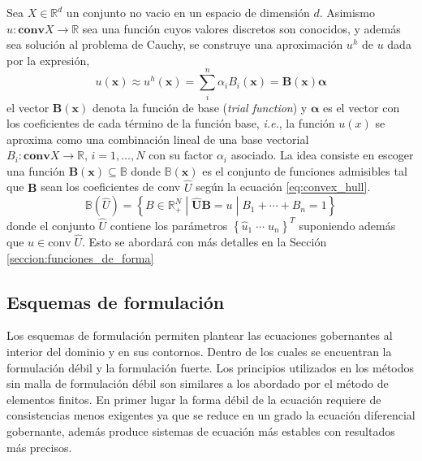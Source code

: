 Sea $X \in \mathbb{R}^d$ un conjunto no vacio en un espacio de dimensión $d$. Asimismo $u : \bm{\mbox{conv}} X \rightarrow \mathbb{R}$ sea una función cuyos valores discretos son conocidos, y además sea solución al problema de Cauchy, se construye una aproximación $u^h$ de $u$ dada por la expresión, 
\begin{equation} \label{ec:1app} 
    u(\bm{x}) \approx u^h(\bm{x}) = \sum_i^n \alpha_i B_i (\bm{x}) = \bm{B}(\bm{x}) \bm{\alpha} 
\end{equation}
el vector $\bm{B}(\bm{x})$ denota la función de base (\textit{trial function}) y $\bm{\alpha}$ es el vector con los coeficientes de cada término de la función base, \textit{i.e.}, la función $u(x)$ se aproxima como una combinación lineal de una base vectorial $B_i : \bm{\mbox{conv}} X \rightarrow \mathbb{R}, \, i=1,\ldots,N$ con su factor $\alpha_i$ asociado. La idea consiste en escoger una función $\bm{B}(\bm{x}) \subseteq \mathbb{B}$ donde $\mathbb{B}(\bm{x})$ es el conjunto de funciones admisibles tal que $\bm{B}$ sean los coeficientes de conv $\hat{U}$ según la ecuación \ref{eq:convex_hull}. 
\begin{equation}
    \mathbb{B}(\hat{U}) = \left\{ B \in \mathbb{R}_+^N \; | \; \hat{\bm{U}} \bm{B} = u \; | \;  B_1 + \cdots + B_n = 1  \right\} 
\end{equation}
donde el conjunto $\hat{U}$ contiene los parámetros $\left\{ \hat{u}_1 \; \cdots \; u_n \right\}^T$ suponiendo además que $u \in \mbox{conv} \; \hat{U}$. Esto se abordará con más detalles en la Sección \ref{seccion:funciones_de_forma}



\subsection{Esquemas de formulación}
Los esquemas de formulación permiten plantear las ecuaciones gobernantes al interior del dominio y en sus contornos. Dentro de los cuales se encuentran la formulación débil y la formulación fuerte. Los principios utilizados en los métodos sin malla de formulación débil son similares a los abordado por el método de elementos finitos. En primer lugar la forma débil de la ecuación requiere de consistencias menos exigentes ya que se reduce en un grado la ecuación diferencial gobernante, además produce sistemas de ecuación más estables con resultados más precisos. 


